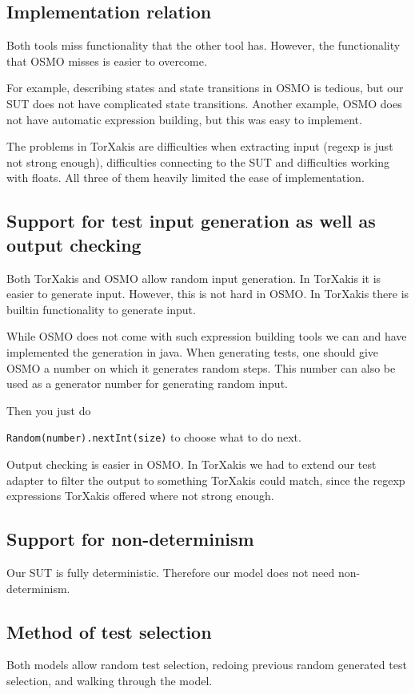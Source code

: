 \documentclass[11pt,a4paper]{article}
\begin{document}
\subsection{Implementation relation}
Both tools miss functionality that the other tool has. However, the functionality that OSMO misses is easier to overcome.

For example, describing states and state transitions in OSMO is tedious, but our SUT does not have complicated state transitions.
Another example, OSMO does not have automatic expression building, but this was easy to implement.

The problems in TorXakis are difficulties when extracting input (regexp is just not strong enough), difficulties connecting to the SUT and difficulties working with floats. All three of them heavily limited the ease of implementation.

\subsection{Support for test input generation as well as output checking}

Both TorXakis and OSMO allow random input generation. In TorXakis it
is easier to generate input. However, this is not hard in OSMO. In
TorXakis there is builtin functionality to generate input.

While OSMO does not come with such expression building tools we can
and have implemented the generation in java. When generating tests,
one should give OSMO a number on which it generates random steps. This
number can also be used as a generator number for generating random
input.

Then you just do

\verb|Random(number).nextInt(size)| to choose what to do next.

Output checking is easier in OSMO. In TorXakis we had to extend our
test adapter to filter the output to something TorXakis could match,
since the regexp expressions TorXakis offered where not strong enough.

\subsection{Support for non-determinism}
Our SUT is fully deterministic. Therefore our model does not need
non-determinism.

\subsection{Method of test selection}
Both models allow random test selection, redoing previous random
generated test selection, and walking through the model.
\end{document}
